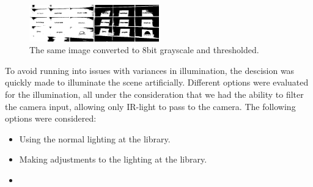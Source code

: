 \begin{figure}[htbp] 
\centering 
\includegraphics[width=0.5\textwidth]{Pictures/HjoerringLibrary/scene_lighting_thresholded.png} 
\caption{The same image converted to 8bit grayscale and thresholded.} 
\label{fig:scene_thresholded} 
\end{figure}

To avoid running into issues with variances in illumination, the descision was quickly made to illuminate the scene artificially. Different options were evaluated for the illumination, all under the consideration that we had the ability to filter the camera input, allowing only IR-light to pass to the camera. The following options were considered:

\begin{itemize}
\item Using the normal lighting at the library.
\item Making adjustments to the lighting at the library.
\item 
\end{itemize}